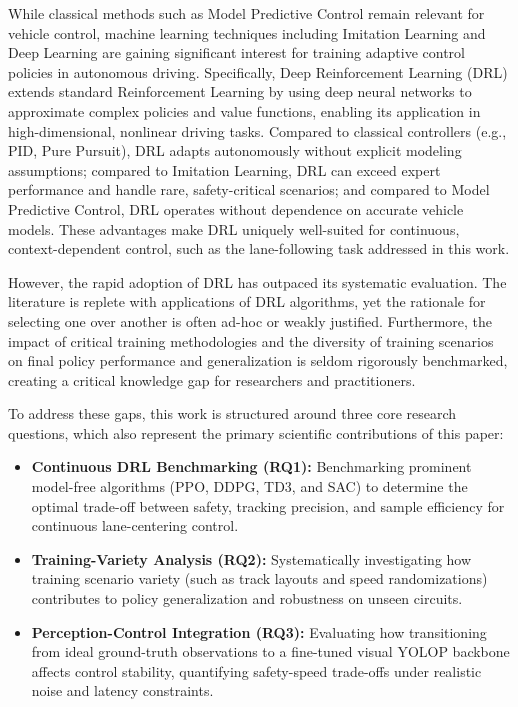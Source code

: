 \documentclass[sn-mathphys,Numbered]{sn-jnl}
\begin{document}
While classical methods such as Model Predictive Control remain relevant for vehicle control, machine learning techniques including Imitation Learning and Deep Learning are gaining significant interest for training adaptive control policies in autonomous driving. Specifically, Deep Reinforcement Learning (DRL) extends standard Reinforcement Learning by using deep neural networks to approximate complex policies and value functions, enabling its application in high-dimensional, nonlinear driving tasks. Compared to classical controllers (e.g., PID, Pure Pursuit), DRL adapts autonomously without explicit modeling assumptions; compared to Imitation Learning, DRL can exceed expert performance and handle rare, safety-critical scenarios; and compared to Model Predictive Control, DRL operates without dependence on accurate vehicle models. These advantages make DRL uniquely well-suited for continuous, context-dependent control, such as the lane-following task addressed in this work.

However, the rapid adoption of DRL has outpaced its systematic evaluation. The literature is replete with applications of DRL algorithms, yet the rationale for selecting one over another is often ad-hoc or weakly justified. Furthermore, the impact of critical training methodologies and the diversity of training scenarios on final policy performance and generalization is seldom rigorously benchmarked, creating a critical knowledge gap for researchers and practitioners. 

To address these gaps, this work is structured around three core research questions, which also represent the primary scientific contributions of this paper:
\begin{itemize}
    \item \textbf{Continuous DRL Benchmarking (RQ1):} Benchmarking prominent model-free algorithms (PPO, DDPG, TD3, and SAC) to determine the optimal trade-off between safety, tracking precision, and sample efficiency for continuous lane-centering control.
    \item \textbf{Training-Variety Analysis (RQ2):} Systematically investigating how training scenario variety (such as track layouts and speed randomizations) contributes to policy generalization and robustness on unseen circuits.
    \item \textbf{Perception-Control Integration (RQ3):} Evaluating how transitioning from ideal ground-truth observations to a fine-tuned visual YOLOP backbone affects control stability, quantifying safety-speed trade-offs under realistic noise and latency constraints.
\end{itemize}
\end{document}
